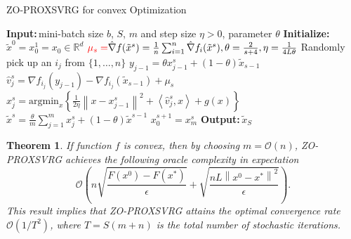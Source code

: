 \documentclass{article}
\newcommand*{\R}{\mathbb{R}}
\newcommand{\norm}[1]{\left\lVert#1\right\rVert}
\newcommand{\Iprod}[2]{\left\langle #1,#2\right\rangle}
\newcommand{\Initialize}{\textbf{Initialize:}{\,}}
\newcommand{\Input}{\textbf{Input:}{\,}}
\newcommand{\Output}{\textbf{Output:}{\,}}
\newtheorem{theorem}{Theorem}[section]
\theoremstyle{definition}
\theoremstyle{remark}
\begin{document}
\begin{algorithm}\label{APGnonconvex-Algo}
\caption{ZO-PROXSVRG for convex Optimization}\begin{algorithmic}[1]
\State\Input mini-batch size $b$, $S$, $m$ and step size $\eta > 0$, parameter $\theta$
\State\Initialize $\tilde{x}^0 = x_0^1 = x_0 \in \R^d$
\State ${\color{red}\mu_s = }\hat{\nabla}f(\tilde{x}^s) = \frac{1}{n}\sum_{i=1}^n \hat{\nabla}f_i(\tilde{x}^s), \theta=\frac{2}{s+4}, \eta = \frac{1}{4L\theta}$
\State Randomly pick up an $i_j$ from
$\{1,\ldots,n\}$
\State $y_{j-1} = \theta x_{j-1}^s+(1-\theta)\tilde{x}_{s-1}$
\State $\hat{v}_j^s = \nabla f_{i_j}(y_{j-1})-\nabla f_{i_j}(\tilde{x}_{s-1})+\mu_s$
\State $x_{j}^s=\text{argmin}_{x}\left\{\frac{1}{2\eta}\norm{x-x_{j-1}^s}^2+\Iprod{\hat{v}_j^s}{x}+g(x)\right\}$
\EndFor
\State $\tilde{x}^s=\frac{\theta}{m}\sum_{j=1}^{m}x_j^s + (1-\theta)\tilde{x}^{s-1}$ 
\State $x_0^{s+1} = x_m^s$
 \EndFor
 \State\Output ${\tilde{x}}_{S}$
\end{algorithmic}
\end{algorithm}
\begin{theorem}
If function $f$ is convex, then by choosing $m=\mathcal{O}(n)$, ZO-PROXSVRG achieves the following oracle complexity in expectation
\[
\mathcal{O}\left(n\sqrt{\frac{F(x^0)-F(x^*)}{\epsilon}}+\sqrt{\frac{nL\norm{x^0-x^*}^2}{\epsilon}}\right).
\]
This result implies that ZO-PROXSVRG attains the optimal convergence rate $\mathcal{O}(1/T^2)$, where $T=S(m+n)$ is the total number of stochastic iterations.
\end{theorem}
\end{document}
